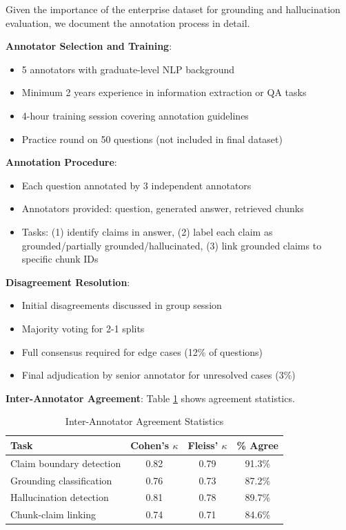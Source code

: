 \documentclass[conference]{IEEEtran}
\begin{document}
Given the importance of the enterprise dataset for grounding and hallucination evaluation, we document the annotation process in detail.

\textbf{Annotator Selection and Training}:
\begin{itemize}
    \item 5 annotators with graduate-level NLP background
    \item Minimum 2 years experience in information extraction or QA tasks
    \item 4-hour training session covering annotation guidelines
    \item Practice round on 50 questions (not included in final dataset)
\end{itemize}

\textbf{Annotation Procedure}:
\begin{itemize}
    \item Each question annotated by 3 independent annotators
    \item Annotators provided: question, generated answer, retrieved chunks
    \item Tasks: (1) identify claims in answer, (2) label each claim as grounded/partially grounded/hallucinated, (3) link grounded claims to specific chunk IDs
\end{itemize}

\textbf{Disagreement Resolution}:
\begin{itemize}
    \item Initial disagreements discussed in group session
    \item Majority voting for 2-1 splits
    \item Full consensus required for edge cases (12\% of questions)
    \item Final adjudication by senior annotator for unresolved cases (3\%)
\end{itemize}

\textbf{Inter-Annotator Agreement}: Table \ref{tab:iaa} shows agreement statistics.

\begin{table}[htbp]
\caption{Inter-Annotator Agreement Statistics}
\label{tab:iaa}
\centering
\begin{tabular}{lccc}
\toprule
\textbf{Task} & \textbf{Cohen's $\kappa$} & \textbf{Fleiss' $\kappa$} & \textbf{\% Agree} \\
\midrule
Claim boundary detection & 0.82 & 0.79 & 91.3\% \\
Grounding classification & 0.76 & 0.73 & 87.2\% \\
Hallucination detection & 0.81 & 0.78 & 89.7\% \\
Chunk-claim linking & 0.74 & 0.71 & 84.6\% \\
\bottomrule
\end{tabular}
\end{table}
\end{document}
